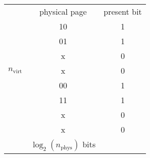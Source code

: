 \renewcommand{\arraystretch}{1.3}
\setlength{\oldtabcolsep}{\tabcolsep}\setlength\tabcolsep{6pt}
\begin{tabularx}{\linewidth}{@{} c c c@{}}
                                                                                   & physical page                  & present bit \\
    \cmidrule{2-3}
    \multirow{7}{*}{\begin{sideways}$n_{\text{virt}}$\end{sideways}} & 10                             & 1           \\
                                                                                   & 01                             & 1           \\
                                                                                   & x                              & 0           \\
                                                                                   & x                              & 0           \\
                                                                                   & 00                             & 1           \\
                                                                                   & 11                             & 1           \\
                                                                                   & x                              & 0           \\
                                                                                   & x                              & 0           \\
    \cmidrule{2-3}
                                                                                   & $\log_2(n_{\text{phys}})$ bits &
\end{tabularx}

